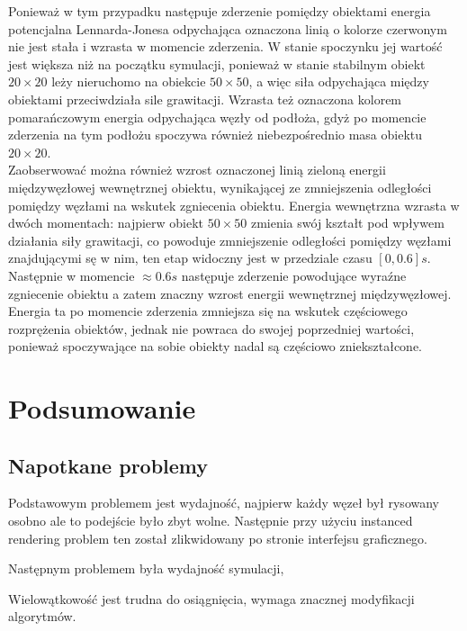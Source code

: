 \documentclass[12pt, letterpaper]{report}
\begin{document}
    Ponieważ w tym przypadku następuje zderzenie pomiędzy obiektami energia potencjalna Lennarda-Jonesa odpychająca
    oznaczona linią o kolorze czerwonym nie jest stała i wzrasta w momencie zderzenia. W stanie spoczynku jej wartość
    jest większa niż na początku symulacji, ponieważ w stanie stabilnym obiekt $20 \times 20$ leży nieruchomo na obiekcie
    $50 \times 50$, a więc siła odpychająca między obiektami przeciwdziała sile grawitacji. 
    Wzrasta też oznaczona kolorem pomarańczowym energia odpychająca węzły od podłoża, gdyż po momencie zderzenia na 
    tym podłożu spoczywa również niebezpośrednio masa  obiektu $20 \times 20$. \\
    
    Zaobserwować można również wzrost oznaczonej linią zieloną energii międzywęzłowej wewnętrznej obiektu, wynikającej ze 
    zmniejszenia odległości pomiędzy węzłami na wskutek zgniecenia obiektu. Energia wewnętrzna wzrasta w dwóch momentach: 
    najpierw obiekt $50 \times 50$ zmienia swój kształt pod wpływem działania siły grawitacji, co powoduje zmniejszenie 
    odległości pomiędzy węzłami znajdującymi sę w nim, ten etap widoczny jest w przedziale czasu $[0, 0.6] s$. 
    Następnie w momencie $\approx 0.6 s$ następuje zderzenie powodujące wyraźne zgniecenie obiektu a zatem znaczny wzrost
    energii wewnętrznej międzywęzłowej. Energia ta po momencie zderzenia zmniejsza się na wskutek częściowego rozprężenia
    obiektów, jednak nie powraca do swojej poprzedniej wartości, ponieważ spoczywające na sobie obiekty nadal są 
    częściowo zniekształcone.

\chapter{Podsumowanie}
    \section{Napotkane problemy}
    Podstawowym problemem jest wydajność, najpierw każdy węzeł był rysowany osobno ale to podejście 
    było zbyt wolne. Następnie przy użyciu instanced rendering problem ten został zlikwidowany po 
    stronie interfejsu graficznego.
    
    Następnym problemem była wydajność symulacji,
    
    Wielowątkowość jest trudna do osiągnięcia, wymaga znacznej modyfikacji algorytmów.
\end{document}
